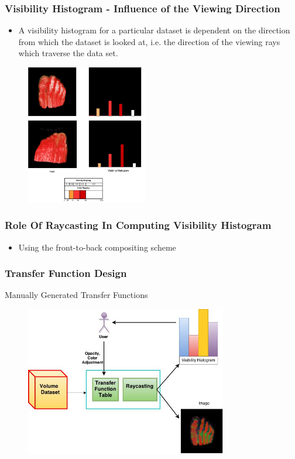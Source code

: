 \documentclass{beamer}
\begin{document}
\begin{frame}
\frametitle{Visibility Histogram - Influence of the Viewing Direction }
\begin{itemize}
\item A visibility histogram for a particular dataset is dependent on the direction from which the dataset is looked at, i.e. the direction of the viewing rays which traverse the data set.
\end{itemize}
\begin{figure}
\centering
\includegraphics[width=150pt]{tf_view_influence.jpg}
\end{figure}
\end{frame}



\begin{frame}
\frametitle{Role Of Raycasting In Computing Visibility Histogram }
\begin{itemize}
\item Using the front-to-back compositing scheme
\end{itemize}
\end{frame}



\begin{frame}
\frametitle{Transfer Function Design}
Manually Generated Transfer Functions
\begin{figure}
\centering
\includegraphics[width=250pt]{VH_pipeline.jpg}
\end{figure}
\end{frame}
\end{document}
